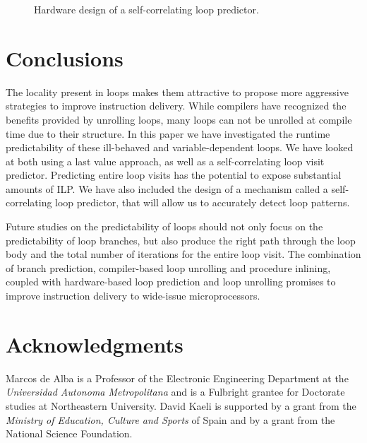 \documentclass[times,10pt,twocolumn]{article}
\newcommand{\vs}{\vspace}
\begin{document}
\begin{figure}
\vspace{0.2 in}
\setlength{\epsfxsize}{10cm}%
\centerline{}
\caption{Hardware design of a self-correlating loop predictor.}
\label{fig:predictor}
\end{figure}


\section{Conclusions}
The locality present in loops makes them attractive to propose more 
aggressive strategies to improve instruction delivery.  While compilers
have recognized the benefits provided by unrolling loops, many loops 
can not be unrolled at compile time due to their structure.  In this
paper we have investigated the runtime predictability of these ill-behaved and
variable-dependent loops.  We have looked at both using a last value approach,
as well as a self-correlating loop visit predictor.  
Predicting entire loop visits has the potential to expose substantial
amounts of ILP.  We have also included the design of a mechanism called a
self-correlating loop predictor, that will allow us to accurately detect
loop patterns.  

Future studies on the predictability of loops should not only focus on the predictability of loop 
branches, but also produce the right path through the
loop body and the total number of iterations for the entire loop visit. 
The combination of branch prediction, compiler-based loop unrolling and
procedure inlining, coupled with hardware-based loop prediction and loop 
unrolling promises to improve instruction delivery to wide-issue microprocessors.

\section*{Acknowledgments}
Marcos de Alba is a Professor of the Electronic Engineering Department at the 
{\it Universidad Autonoma Metropolitana} and is a Fulbright grantee for 
Doctorate studies at Northeastern University.  David Kaeli is supported by
a grant from the {\it Ministry of Education, Culture and Sports} of Spain and
by a grant from the National Science Foundation. 



\end{document}
